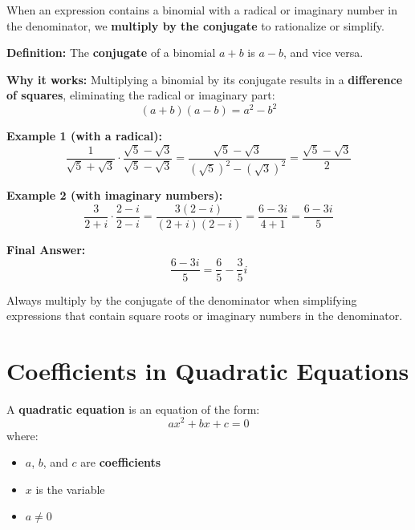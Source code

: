 \documentclass[11pt]{article}
\begin{document}
When an expression contains a binomial with a radical or imaginary number in the denominator, we \textbf{multiply by the conjugate} to rationalize or simplify.

\medskip

\textbf{Definition:} The \textbf{conjugate} of a binomial \( a + b \) is \( a - b \), and vice versa.

\medskip

\textbf{Why it works:} Multiplying a binomial by its conjugate results in a \textbf{difference of squares}, eliminating the radical or imaginary part:
\[
(a + b)(a - b) = a^2 - b^2
\]

\medskip

\textbf{Example 1 (with a radical):}
\[
\frac{1}{\sqrt{5} + \sqrt{3}} \cdot \frac{\sqrt{5} - \sqrt{3}}{\sqrt{5} - \sqrt{3}} = \frac{\sqrt{5} - \sqrt{3}}{(\sqrt{5})^2 - (\sqrt{3})^2} = \frac{\sqrt{5} - \sqrt{3}}{2}
\]

\medskip

\textbf{Example 2 (with imaginary numbers):}
\[
\frac{3}{2 + i} \cdot \frac{2 - i}{2 - i} = \frac{3(2 - i)}{(2 + i)(2 - i)} = \frac{6 - 3i}{4 + 1} = \frac{6 - 3i}{5}
\]

\medskip

\textbf{Final Answer:}
\[
\frac{6 - 3i}{5} = \frac{6}{5} - \frac{3}{5}i
\]

\begin{tcolorbox}[colback=blue!5!white, colframe=blue!80!black, title=Key Tip]
Always multiply by the conjugate of the denominator when simplifying expressions that contain square roots or imaginary numbers in the denominator.
\end{tcolorbox}

\section{Coefficients in Quadratic Equations}

A \textbf{quadratic equation} is an equation of the form:
\[
ax^2 + bx + c = 0
\]
where:
\begin{itemize}
  \item \( a \), \( b \), and \( c \) are \textbf{coefficients}
  \item \( x \) is the variable
  \item \( a \neq 0 \)
\end{itemize}
\end{document}
